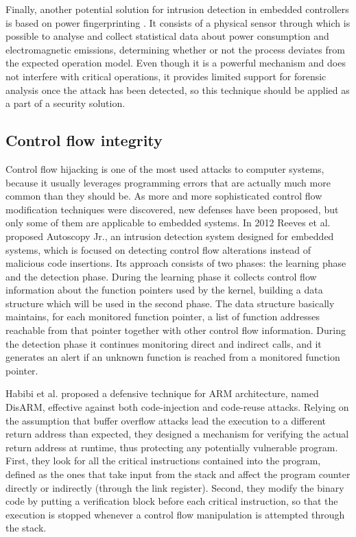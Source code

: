 Finally, another potential solution for intrusion detection in embedded controllers is based on power fingerprinting \cite{power-fingerprinting}.
It consists of a physical sensor through which is possible to analyse and collect statistical data about power consumption and electromagnetic emissions,
determining whether or not the process deviates from the expected operation model. Even though it is a powerful mechanism and does not interfere with critical operations,
it provides limited support for forensic analysis once the attack has been detected, so this technique should be applied as a part of a security solution.


\subsection{Control flow integrity}

Control flow hijacking is one of the most used attacks to computer systems, because it usually leverages programming errors that are actually much more common than they should be.
As more and more sophisticated control flow modification techniques were discovered, new defenses have been proposed, but only some of them are applicable to embedded systems.
In 2012 Reeves et al. \cite{autoscopy} proposed Autoscopy Jr., an intrusion detection system designed for embedded systems, which is focused on detecting
control flow alterations instead of malicious code insertions. Its approach consists of two phases: the learning phase and the detection phase.
During the learning phase it collects control flow information about the function pointers used by the kernel,
building a data structure which will be used in the second phase. The data structure basically maintains, for each monitored function pointer,
a list of function addresses reachable from that pointer together with other control flow information. During the detection phase it continues monitoring direct and indirect calls,
and it generates an alert if an unknown function is reached from a monitored function pointer.

Habibi et al. \cite{disarm} proposed a defensive technique for ARM architecture, named DisARM, effective against both code-injection and code-reuse attacks.
Relying on the assumption that buffer overflow attacks lead the execution to a different return address than expected,
they designed a mechanism for verifying the actual return address at runtime, thus protecting any potentially vulnerable program.
First, they look for all the critical instructions contained into the program, defined as the ones that take input from the stack
and affect the program counter directly or indirectly (\eg through the link register).
Second, they modify the binary code by putting a verification block before each critical instruction,
so that the execution is stopped whenever a control flow manipulation is attempted through the stack.

